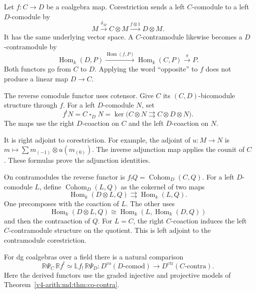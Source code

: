 Let $f:C\to D$ be a coalgebra map. Corestriction sends a left
$C$-comodule to a left $D$-comodule by
\begin{equation}\label{v4-arith:md:eq:corestriction}
 M\xrightarrow{\delta_M}C\otimes M
 \xrightarrow{f\otimes1}D\otimes M.
\end{equation}
It has the same underlying vector space. A $C$-contramodule
likewise becomes a $D$-contramodule by
\[
 \operatorname{Hom}_k(D,P)\xrightarrow{\operatorname{Hom}(f,P)}
 \operatorname{Hom}_k(C,P)\xrightarrow{\pi}P.
\]
Both functors go from $C$ to $D$. Applying the word
``opposite'' to $f$ does not produce a linear map $D\to C$.

The reverse comodule functor uses cotensor. Give $C$ its
$(C,D)$-bicomodule structure through $f$. For a left
$D$-comodule $N$, set
\[
 f^!N=C\mathbin{\square}_DN
 =\ker\bigl(C\otimes N\rightrightarrows C\otimes D\otimes N\bigr).
\]
The maps use the right $D$-coaction on $C$ and the left
$D$-coaction on $N$.

It is right adjoint to corestriction.
For example, the adjoint of $u:M\to N$ is
$m\mapsto\sum m_{(-1)}\otimes u(m_{(0)})$.
The inverse adjunction map applies the counit of $C$.
These formulas prove the adjunction identities.

On contramodules the reverse functor is
$f_!Q=\operatorname{Cohom}_D(C,Q)$. For a left $D$-comodule
$L$, define $\operatorname{Cohom}_D(L,Q)$ as the cokernel of
two maps
\[
 \operatorname{Hom}_k(D\otimes L,Q)
 \rightrightarrows\operatorname{Hom}_k(L,Q).
\]
One precomposes with the coaction of $L$. The other uses
\[
 \operatorname{Hom}_k(D\otimes L,Q)
 \cong\operatorname{Hom}_k(L,\operatorname{Hom}_k(D,Q))
\]
and then the contraaction of $Q$.
For $L=C$, the right $C$-coaction induces the left
$C$-contramodule structure on the quotient.
This is left adjoint to the contramodule corestriction.

\begin{proposition}
\label{v4-arith:md:prop:naturality}
For dg coalgebras over a field there is a natural comparison
\begin{equation}\label{v4-arith:md:eq:naturality}
 \mathbb R\Psi_C\,\mathbb Rf^!
 \simeq\mathbb Lf_!\,\mathbb R\Psi_D
 :D^{\mathrm{co}}(D\text{-comod})
 \longrightarrow D^{\mathrm{ctr}}(C\text{-contra}).
\end{equation}
Here the derived functors use the graded injective and projective
models of Theorem~\ref{v4-arith:md:thm:co-contra}.
\end{proposition}

